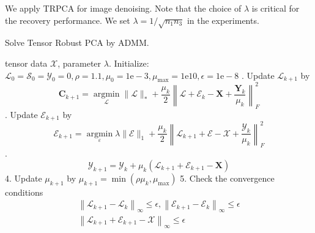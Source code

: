 \documentclass[english]{article}
\newcommand{\<}{\langle}
\renewcommand{\>}{\rangle}
\theoremstyle{definition}
\begin{document}
We apply TRPCA for image denoising. Note that the choice of $ \lambda $ is critical for the recovery performance. We set $ \lambda=1 / \sqrt{n_{1} n_{3}} $ in the experiments.\\
\begin{algorithm}  
	\caption{Solve Tensor Robust PCA by ADMM.}
	\begin{algorithmic} 
		\Require  
		tensor data $ \mathcal{X} $, parameter $ \lambda $.
		\State  Initialize: $ \mathcal{L}_{0}=\mathcal{S}_{0}=\mathcal{Y}_{0}=0, \rho=1.1, \mu_{0}=1 \mathrm{e}-3, 
		\mu_{\max }=1 \mathrm{e} 10, \epsilon=1 \mathrm{e}-8 $
		. Update $ \mathcal{L}_{k+1} $ by
		$$ \boldsymbol{C}_{k+1}=\underset{\boldsymbol{\boldsymbol{\mathcal { L }}}}{\operatorname{argmin}}\|\boldsymbol{\mathcal { L }}\|_{*}+\frac{\mu_{k}}{2}\left\|\boldsymbol{\mathcal { L }}+\boldsymbol{\mathcal { E }}_{k}-\boldsymbol{X}+\frac{\boldsymbol{Y}_{k}}{\mu_{k}}\right\|_{F}^{2} $$
		. Update $ \mathcal{E}_{k+1} $ by
		$$
		\mathcal{E}_{k+1}=\underset{\varepsilon}{\operatorname{argmin}} \lambda\|\mathcal{E}\|_{1}+\frac{\mu_{k}}{2}\left\|\mathcal{L}_{k+1}+\mathcal{E}-\mathcal{X}+\frac{\mathcal{Y}_{k}}{\mu_{k}}\right\|_{F}^{2} $$
		.  $$\boldsymbol{\mathcal{Y}}_{k+1}=\boldsymbol{\mathcal{Y}}_{k}+\mu_{k}\left(\mathcal{L}_{k+1}+\mathcal{E}_{k+1}-\boldsymbol{X}\right) $$
		4. Update $ \mu_{k+1} $ by $ \mu_{k+1}=\min \left(\rho \mu_{k}, \mu_{\max }\right) $
		5. Check the convergence conditions
		\begin{equation*}
		\begin{array}{l}
		\left\|\mathcal{L}_{k+1}-\mathcal{L}_{k}\right\|_{\infty} \leq \epsilon,\left\|\mathcal{E}_{k+1}-\mathcal{E}_{k}\right\|_{\infty} \leq \epsilon \\
		\left\|\mathcal{L}_{k+1}+\mathcal{E}_{k+1}-\mathcal{X}\right\|_{\infty} \leq \epsilon
		\end{array}
		\end{equation*}
		
		\EndWhile 
	\end{algorithmic}
\end{algorithm}
\end{document}
